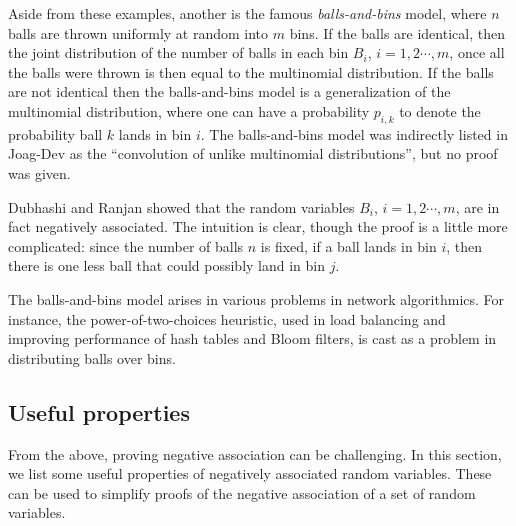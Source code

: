 Aside from these examples, another is the famous \textit{balls-and-bins} model, where $n$ balls
are thrown uniformly at random into $m$ bins. If the balls are identical, then the joint distribution of
the number of balls in each bin $B_i$, $i=1,2\cdots,m$, once all the balls were thrown is then 
equal to the multinomial distribution. If the balls are not identical then the balls-and-bins model is a generalization 
of the multinomial distribution, where one can have a probability $p_{i,k}$ to denote the
probability ball $k$ lands in bin $i$. The balls-and-bins model was indirectly listed in 
Joag-Dev \etal \cite{JoagDev83NA} as the ``convolution of unlike multinomial distributions'', but
no proof was given.

Dubhashi and Ranjan \cite{Dubhashi96BallsBins} showed that the random variables 
$B_i$, $i=1,2\cdots,m$, are in fact negatively associated. The intuition is clear, though the proof is
a little more complicated: since the number of balls $n$ is fixed, if a ball lands in bin $i$, then
there is one less ball that could possibly land in bin $j$. 

The balls-and-bins model arises in various problems in network algorithmics. For instance,
the power-of-two-choices heuristic, used in load balancing \cite{Mitzenmacher01PowerTwo} 
and improving performance of hash tables and Bloom filters, is cast as a problem in 
distributing balls over bins. 




\subsection{Useful properties}

From the above, proving negative association can be challenging. 
In this section, we list some useful properties of negatively associated random variables.
These can be used to simplify proofs of the negative association of a set of random variables.

